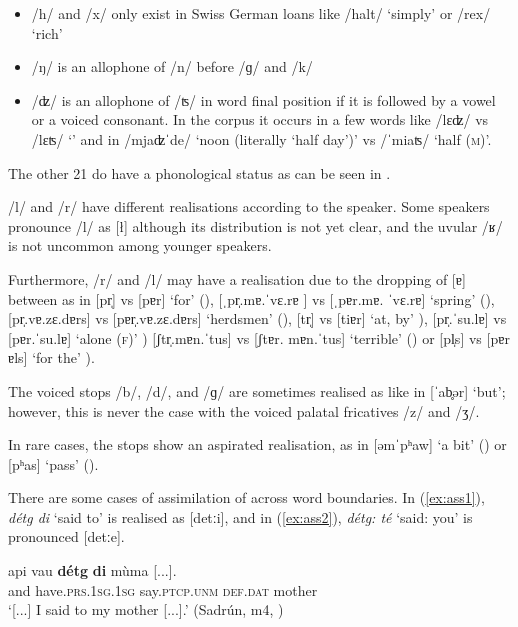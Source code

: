 \begin{itemize}
	\item /h/ and /x/ only exist in Swiss German loans like  /halt/ `simply' or /rex/ `rich'
	
	\item /ŋ/ is an allophone of /n/ before /ɡ/ and /k/
	
	\item /ʣ/ is an allophone of /ʦ/ in word final position if it is followed by a vowel or a voiced consonant. In the corpus it occurs in a few words like /lɛʣ/ vs /lɛʦ/ `' and in /mjaʣˈde/ `noon (literally `half day')' vs /ˈmiaʦ/ `half \textsc{(m})'.
\end{itemize}

The other 21  do have a phonological status as can be seen in .

/l/ and /r/ have different realisations according to the speaker. Some speakers pronounce /l/ as [ł] although its distribution is not yet clear, and the uvular /ʁ/ is not uncommon among younger speakers.

Furthermore, /r/ and /l/ may have a  realisation due to the dropping of [ɐ] between  as  in
[pr̩] vs [pɐr] `for' (),
[ˌpr̩.mɐ.ˈvɛ.rɐ ]  vs [ˌpɐr.mɐ. ˈvɛ.rɐ] `spring' (),
[pr̩.vɐ.zɛ.dɐrs] vs  [pɐr̩.vɐ.zɛ.dɐrs] `herdsmen' (),
[tr̩] vs [tiɐr] `at, by' ),
[pr̩.ˈsu.lɐ] vs [pɐr.ˈsu.lɐ] `alone (\textsc{f})' )
[ʃtr̩.mɐn.ˈtus] vs [ʃtɐr. mɐn.ˈtus] `terrible' () or
[pl̩s] vs [pɐr ɐls] `for the' ).

The voiced stops /b/, /d/, and /ɡ/ are sometimes realised as  like in [ˈab̥ər] `but'; however, this is never the case with the voiced palatal fricatives /z/ and /ʒ/.

\newpage
In rare cases, the  stops show an aspirated realisation, as in [əmˈpʰaw] `a bit' () or [pʰas] `pass' ().

There are some cases of assimilation of  across word boundaries. In (\ref{ex:ass1}), \textit{détg di} `said to' is realised as [detːi], and in (\ref{ex:ass2}), \textit{détg: té} `said: you' is pronounced [detːe].


\ea\label{ex:ass1}
\gll [...] api vau \textbf{détg} \textbf{di} mùma [...].\\
{} and have.\textsc{prs.1sg.1sg} say.\textsc{ptcp.unm} \textsc{def.dat} mother\\
\glt `[...] I said to my mother [...].' (Sadrún, m4,   )
\z

